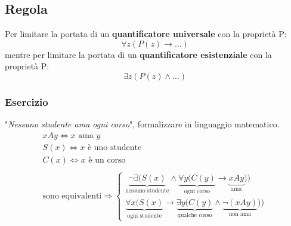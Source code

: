 \documentclass[italian]{article}
\begin{document}
\subsection{Regola}
Per limitare la portata di un \textbf{quantificatore universale} con la proprietà P:
\[
	\forall z(P(z) \to \dots)
\]
mentre per limitare la portata di un \textbf{quantificatore esistenziale} con la proprietà P:
\[
	\exists z(P(z) \land \dots)
\]

\subsubsection{Esercizio}
"\textit{Nessuno studente ama ogni corso}", formalizzare in linguaggio matematico.\\
\begin{gather*}
	xAy \Leftrightarrow x \text{ ama } y \\
	S(x) \Leftrightarrow x\text{ è uno studente} \\
	C(x) \Leftrightarrow x\text{ è un corso} \\\\
	\text{sono equivalenti} \Rightarrow 
	\begin{cases*}
		\underbrace{\lnot \exists (S(x)}_{\text{nessuno studente}} \land \underbrace{\forall y(C(y)}_{\text{ogni corso}}\to \underbrace{xAy}_{\text{ama}})) \\
		\underbrace{\forall x(S(x)}_{\text{ogni studente}}\to \underbrace{\exists y(C(y)}_{\text{qualche corso}} \land \underbrace{\lnot(xAy)}_{\text{non ama}}))
	\end{cases*}
\end{gather*}
\end{document}
